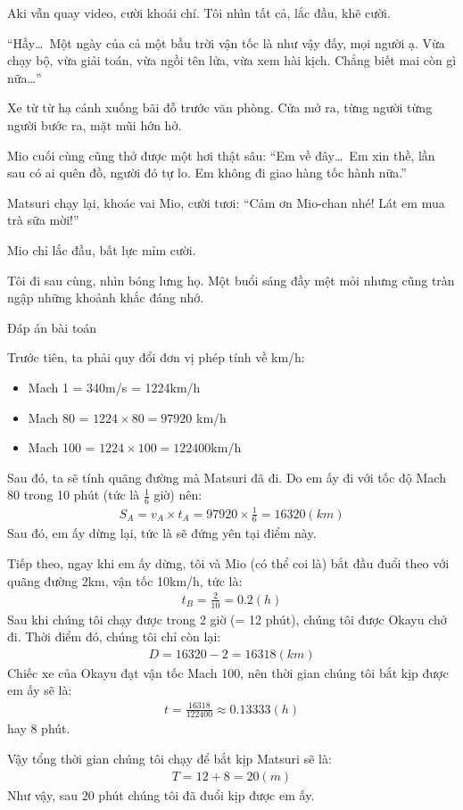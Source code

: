 \documentclass[../main.tex]{subfiles}
\begin{document}
Aki vẫn quay video, cười khoái chí. Tôi nhìn tất cả, lắc đầu, khẽ cười.

``Hầy\dots\ Một ngày của cả một bầu trời vận tốc là như vậy đấy, mọi người ạ. Vừa chạy bộ, vừa giải toán, vừa ngồi tên lửa, vừa xem hài kịch. Chẳng biết mai còn gì nữa\dots''

\ct

Xe từ từ hạ cánh xuống bãi đỗ trước văn phòng. Cửa mở ra, từng người từng người bước ra, mặt mũi hớn hở.

Mio cuối cùng cũng thở được một hơi thật sâu: ``Em về đây\dots\ Em xin thề, lần sau có ai quên đồ, người đó tự lo. Em không đi giao hàng tốc hành nữa.''

Matsuri chạy lại, khoác vai Mio, cười tươi: ``Cảm ơn Mio-chan nhé! Lát em mua trà sữa mời!''

Mio chỉ lắc đầu, bất lực mỉm cười.

Tôi đi sau cùng, nhìn bóng lưng họ. Một buổi sáng đầy mệt mỏi nhưng cũng tràn ngập những khoảnh khắc đáng nhớ.

\begin{center}{\abv\Large Đáp án bài toán}\end{center}

Trước tiên, ta phải quy đổi đơn vị phép tính về km/h:
\begin{itemize}
  \item Mach 1 = 340m/s = 1224km/h
  \item Mach 80 = \(1224 \times 80 = 97920\) km/h
  \item Mach 100 = \(1224 \times 100 = 122400\)km/h
\end{itemize}

Sau đó, ta sẽ tính quãng đường mà Matsuri đã đi. Do em ấy đi với tốc độ Mach 80 trong 10 phút (tức là \(\frac{1}{6}\) giờ) nên:
\begin{align*}
  S_A = v_A \times t_A = 97920 \times \frac{1}{6} = 16320 (km)
\end{align*}
Sau đó, em ấy dừng lại, tức là sẽ đứng yên tại điểm này.

Tiếp theo, ngay khi em ấy dừng, tôi và Mio (có thể coi là) bắt đầu đuổi theo với quãng đường 2km, vận tốc 10km/h, tức là:
\begin{align*}
  t_B = \frac{2}{10} = 0.2 (h)
\end{align*}
Sau khi chúng tôi chạy được trong 2 giờ (= 12 phút), chúng tôi được Okayu chở đi. Thời điểm đó, chúng tôi chỉ còn lại:
\begin{align*}
  D = 16320 - 2 = 16318 (km)
\end{align*}
Chiếc xe của Okayu đạt vận tốc Mach 100, nên thời gian chúng tôi bắt kịp được em ấy sẽ là:
\begin{align*}
  t = \frac{16318}{122400} \approx 0.13333 (h)
\end{align*}
hay 8 phút.

Vậy tổng thời gian chúng tôi chạy để bắt kịp Matsuri sẽ là:
\begin{align*}
  T = 12 + 8 = 20 (m)
\end{align*}
Như vậy, sau 20 phút chúng tôi đã đuổi kịp được em ấy.
\end{document}
